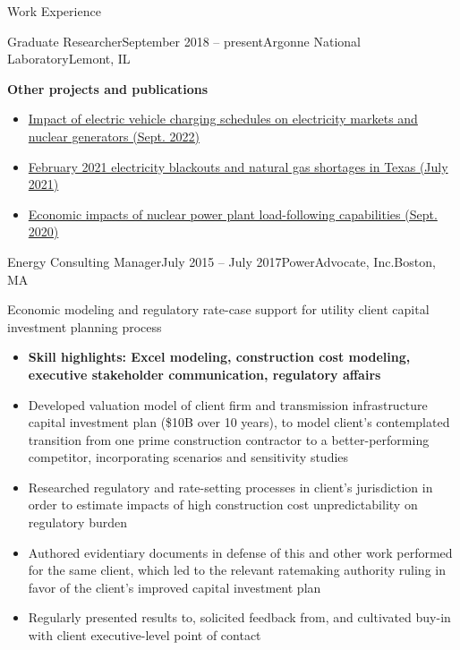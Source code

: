 \documentclass{resume} %
\begin{document}
\begin{rSection}{Work Experience}
\begin{rSubsection}{Graduate Researcher}{September 2018 -- present}{Argonne National Laboratory}{Lemont, IL}
  \item \textbf{Other projects and publications}
  \begin{itemize}
    \item \href{https://www.osti.gov/biblio/1891624}{Impact of electric vehicle charging schedules on electricity markets and nuclear generators (Sept. 2022)}
    \item \href{https://www.osti.gov/biblio/1822217}{February 2021 electricity blackouts and natural gas shortages in Texas (July 2021)}
    \item \href{https://www.osti.gov/biblio/1701718}{Economic impacts of nuclear power plant load-following capabilities (Sept. 2020)}
  \end{itemize}

\end{rSubsection}


\begin{rSubsection}{Energy Consulting Manager}{July 2015 -- July 2017}{PowerAdvocate, Inc.}{Boston, MA}
  \setlength{\itemsep}{-3pt}
  \item Economic modeling and regulatory rate-case support for utility client capital investment planning process
  \begin{itemize}
    \item \textbf{Skill highlights: Excel modeling, construction cost modeling, executive stakeholder communication, regulatory affairs}
    \item Developed valuation model of client firm and transmission infrastructure capital investment plan (\$10B over 10 years), to model client's contemplated transition from one prime construction contractor to a better-performing competitor, incorporating scenarios and sensitivity studies
    \item Researched regulatory and rate-setting processes in client's jurisdiction in order to estimate impacts of high construction cost unpredictability on regulatory burden
    \item Authored evidentiary documents in defense of this and other work performed for the same client, which led to the relevant ratemaking authority ruling in favor of the client's improved capital investment plan
    \item Regularly presented results to, solicited feedback from, and cultivated buy-in with client executive-level point of contact
  \end{itemize}
\end{rSubsection}


\end{rSection}
\end{document}
